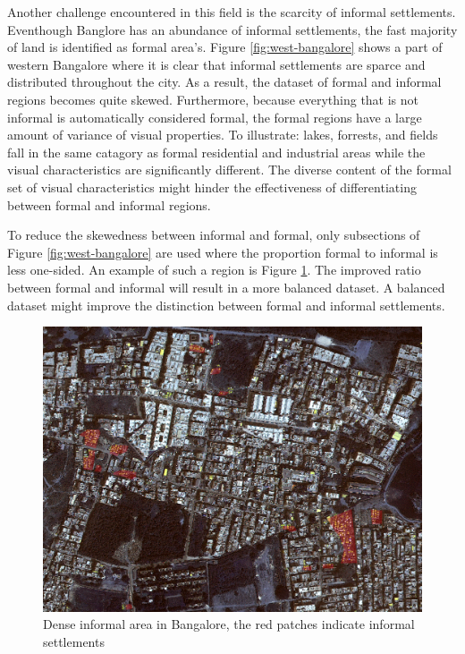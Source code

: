 Another challenge encountered in this field is the scarcity of informal
settlements.  Eventhough Banglore  has an abundance of informal settlements,
the fast majority of land is identified as formal area's. Figure
\ref{fig:west-bangalore} shows a part of western Bangalore where it is clear
that informal settlements are sparce and distributed throughout the city. As
a result, the dataset of formal and informal regions becomes quite skewed.
Furthermore, because everything that is not informal is automatically
considered formal, the formal regions have a large amount of variance of visual
properties.  To illustrate: lakes, forrests, and fields fall in the same
catagory as formal residential and industrial areas while the visual
characteristics are significantly different. The diverse content of the formal
set of visual characteristics might hinder the effectiveness of differentiating
between formal and informal regions. 

To reduce the skewedness between informal and formal, only subsections of Figure \ref{fig:west-bangalore} are
used where the proportion formal to informal is less one-sided. An example of
such a region is Figure \ref{fig:section_3}. The improved ratio between
formal and informal will result in a more balanced dataset. A balanced dataset
might improve the distinction between formal and informal settlements. 

\begin{figure}
\centering
  \includegraphics[width=\linewidth]{images/section_3}
  \caption{Dense informal area in Bangalore, the red patches indicate informal
  settlements}
  \label{fig:section_3}
\end{figure}



